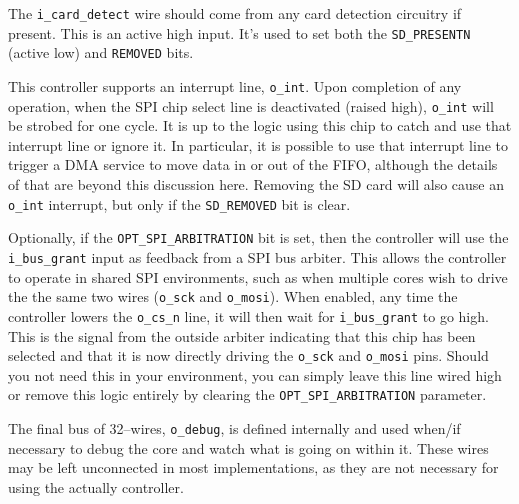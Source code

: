 \documentclass{gqtekspec}
\begin{document}
The {\tt i\_card\_detect} wire should come from any card detection circuitry
if present.  This is an active high input.  It's used to set both the
{\tt SD\_PRESENTN} (active low) and {\tt REMOVED} bits.

This controller supports an interrupt line, {\tt o\_int}.  Upon completion of
any operation, when the SPI chip select line is deactivated (raised high),
{\tt o\_int} will be strobed for one cycle.  It is up to the logic using this
chip to catch and use that interrupt line or ignore it.  In particular, it is
possible to use that interrupt line to trigger a DMA service to move data
in or out of the FIFO, although the details of that are beyond this discussion
here.  Removing the SD card will also cause an {\tt o\_int} interrupt, but only
if the {\tt SD\_REMOVED} bit is clear.

Optionally, if the {\tt OPT\_SPI\_ARBITRATION} bit is set, then the controller
will use the {\tt i\_bus\_grant} input as feedback from a SPI bus arbiter.
This allows the controller to operate in shared SPI environments, such as when
multiple cores wish to drive the the same two wires ({\tt o\_sck} and
{\tt o\_mosi}).  When enabled, any time the controller lowers the {\tt o\_cs\_n}
line, it will then wait for {\tt i\_bus\_grant} to go high.  This is the
signal from the outside arbiter indicating that this chip has been selected
and that it is now directly driving the {\tt o\_sck} and {\tt o\_mosi} pins.
Should you not need this in your environment, you can simply leave this line
wired high or remove this logic entirely by clearing the
{\tt OPT\_SPI\_ARBITRATION} parameter.

The final bus of 32--wires, {\tt o\_debug}, is defined internally and used
when/if necessary to debug the core and watch what is going on within it.
These wires may be left unconnected in most implementations, as they are not
necessary for using the actually controller.

\end{document}
